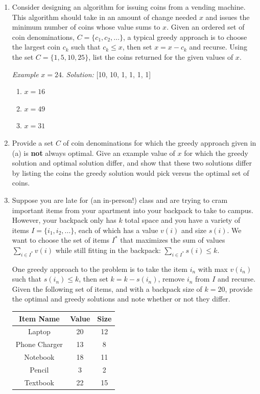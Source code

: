 \documentclass[9pt]{article}
\begin{document}
\item 

\begin{enumerate}

\item Consider designing an algorithm for issuing coins from a vending machine. This algorithm should take in an amount of change needed $x$ and issues the minimum number of coins whose value sums to $x$. Given an ordered set of coin denominations, $C = \{c_{1}, c_{2}, ... \}$, a typical greedy approach is to choose the largest coin $c_k$ such that $c_k \leq x$, then set $x = x - c_k$ and recurse. Using the set $C = \{1, 5, 10, 25\}$, list the coins returned for the given values of $x$.

\textit{Example} $x = 24$. \textit{Solution:} [10, 10, 1, 1, 1, 1]

\begin{enumerate}
    \item $x = 16$
    \item $x = 49$
    \item $x = 31$
\end{enumerate}

\item Provide a set $C$ of coin denominations for which the greedy approach given in (a) is \textbf{not} always optimal. Give an example value of $x$ for which the greedy solution and optimal solution differ, and show that these two solutions differ by listing the coins the greedy solution would pick versus the optimal set of coins.

\item Suppose you are late for (an in-person!) class and are trying to cram important items from your apartment into your backpack to take to campus. However, your backpack only has $k$ total space and you have a variety of items $I = \{i_{1}, i_{2}, ... \}$, each of which has a value $v(i)$ and size $s(i)$. We want to choose the set of items $I^*$ that maximizes the sum of values $\sum_{i \in I^*} v(i)$ while still fitting in the backpack: $\sum_{i \in I^*} s(i) \leq k$. 

One greedy approach to the problem is to take the item $i_{n}$ with max $v(i_n)$ such that $s(i_{n}) \leq k$, then set $k = k - s(i_n)$, remove $i_n$ from $I$ and recurse. Given the following set of items, and with a backpack size of $k = 20$, provide the optimal and greedy solutions and note whether or not they differ.

\begin{center}
\begin{tabular}{c|c|c}
Item Name & Value & Size \\ \hline
Laptop & 20 & 12 \\ 
Phone Charger & 13 & 8 \\
Notebook & 18 & 11 \\
Pencil & 3 & 2 \\
Textbook & 22 & 15
\end{tabular}
\end{center}


\end{enumerate}
\end{document}
